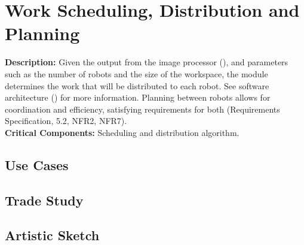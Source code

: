 
\section{Work Scheduling, Distribution and Planning}
\label{sec:planning}
\textbf{Description:} Given the output from the image processor (), and parameters such as the number of robots and the size of the workspace, the module determines the work that will be distributed to each robot. See software architecture () for more information. Planning between robots allows for coordination and efficiency, satisfying requirements for both (Requirements Specification, 5.2, NFR2, NFR7). \\
\textbf{Critical Components:} Scheduling and distribution algorithm. \\



\subsection{Use Cases}

\subsection{Trade Study}

\subsection{Artistic Sketch}